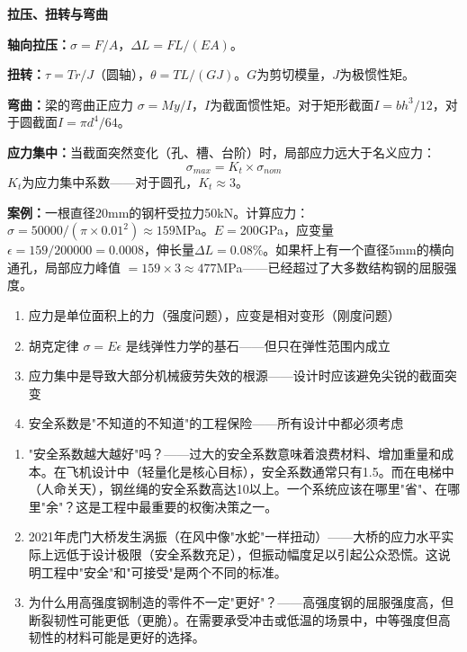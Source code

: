 \documentclass[a4paper,11pt]{ctexbook}
\newenvironment{quantitative}{
  \vspace{0.3cm}
  \noindent\begin{tcolorbox}[colback=quant!5!white,colframe=quant!60!black,title=\textcolor{quant}{\textbf{定量分析}}]
  \vspace{0.1cm}
}{\end{tcolorbox}\vspace{0.3cm}}
\newenvironment{lessonsummary}{
  \vspace{0.3cm}
  \noindent\begin{tcolorbox}[colback=summarybg,colframe=green!50!black,title=\textbf{\textcolor{green!50!black}{总结}}]
  \vspace{0.1cm}
}{\end{tcolorbox}\vspace{0.3cm}}
\newenvironment{discuss}{
  \vspace{0.3cm}
  \noindent\begin{tcolorbox}[colback=discussbg,colframe=orange!60!black,title=\textbf{\textcolor{orange!60!black}{讨论题}}]
  \vspace{0.1cm}
}{\end{tcolorbox}\vspace{0.3cm}}
\begin{document}
\begin{quantitative}
\textbf{拉压、扭转与弯曲}

\textbf{轴向拉压：}$\sigma = F/A$，$\Delta L = FL/(EA)$。

\textbf{扭转：}$\tau = Tr/J$（圆轴），$\theta = TL/(GJ)$。$G$为剪切模量，$J$为极惯性矩。

\textbf{弯曲：}梁的弯曲正应力 $\sigma = My/I$，$I$为截面惯性矩。对于矩形截面$I = bh^3/12$，对于圆截面$I = \pi d^4/64$。

\textbf{应力集中：}当截面突然变化（孔、槽、台阶）时，局部应力远大于名义应力：
\[
\sigma_{max} = K_t \times \sigma_{nom}
\]
$K_t$为应力集中系数——对于圆孔，$K_t \approx 3$。

\textbf{案例：}一根直径20mm的钢杆受拉力50kN。计算应力：$\sigma = 50000/(\pi \times 0.01^2) \approx 159$MPa。$E=200$GPa，应变量$\epsilon = 159/200000 = 0.0008$，伸长量$\Delta L = 0.08\%$。如果杆上有一个直径5mm的横向通孔，局部应力峰值 $= 159 \times 3 \approx 477$MPa——已经超过了大多数结构钢的屈服强度。
\end{quantitative}

\begin{lessonsummary}
\begin{enumerate}
  \item 应力是单位面积上的力（强度问题），应变是相对变形（刚度问题）
  \item 胡克定律 $\sigma = E\epsilon$ 是线弹性力学的基石——但只在弹性范围内成立
  \item 应力集中是导致大部分机械疲劳失效的根源——设计时应该避免尖锐的截面突变
  \item 安全系数是"不知道的不知道"的工程保险——所有设计中都必须考虑
\end{enumerate}
\end{lessonsummary}

\begin{discuss}
\begin{enumerate}
  \item "安全系数越大越好"吗？——过大的安全系数意味着浪费材料、增加重量和成本。在飞机设计中（轻量化是核心目标），安全系数通常只有1.5。而在电梯中（人命关天），钢丝绳的安全系数高达10以上。一个系统应该在哪里"省"、在哪里"余"？这是工程中最重要的权衡决策之一。
  \item 2021年虎门大桥发生涡振（在风中像"水蛇"一样扭动）——大桥的应力水平实际上远低于设计极限（安全系数充足），但振动幅度足以引起公众恐慌。这说明工程中"安全"和"可接受"是两个不同的标准。
  \item 为什么用高强度钢制造的零件不一定"更好"？——高强度钢的屈服强度高，但断裂韧性可能更低（更脆）。在需要承受冲击或低温的场景中，中等强度但高韧性的材料可能是更好的选择。
\end{enumerate}
\end{discuss}
\end{document}
